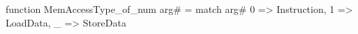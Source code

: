 function MemAccessType_of_num arg# = match arg# {
  0 => Instruction,
  1 => LoadData,
  _ => StoreData
}
